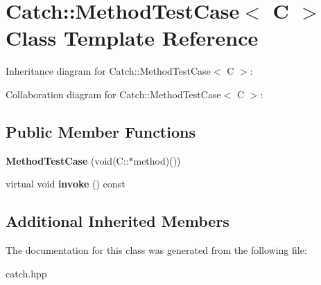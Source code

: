 \hypertarget{class_catch_1_1_method_test_case}{}\section{Catch\+:\+:Method\+Test\+Case$<$ C $>$ Class Template Reference}
\label{class_catch_1_1_method_test_case}


Inheritance diagram for Catch\+:\+:Method\+Test\+Case$<$ C $>$\+:


Collaboration diagram for Catch\+:\+:Method\+Test\+Case$<$ C $>$\+:
\subsection*{Public Member Functions}
\begin{DoxyCompactItemize}
\item 
\mbox{\label{class_catch_1_1_method_test_case_a7b043b85dae371358255dd9dc6582e7b}} 
{\bfseries Method\+Test\+Case} (void(C\+::$\ast$method)())
\item 
\mbox{\label{class_catch_1_1_method_test_case_a4e2263cfa0646f2980768328cb372793}} 
virtual void {\bfseries invoke} () const
\end{DoxyCompactItemize}
\subsection*{Additional Inherited Members}


The documentation for this class was generated from the following file\+:\begin{DoxyCompactItemize}
\item 
catch.\+hpp\end{DoxyCompactItemize}
